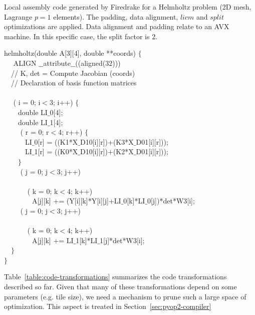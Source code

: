 \documentclass[conference]{IEEEtran}
\begin{document}
\begin{algorithm}[t]
\small
\caption{Local assembly code generated by Firedrake for a Helmholtz problem (2D mesh, Lagrange $p=1$ elements). The padding, data alignment, $licm$ and $split$ optimizations are applied. Data alignment and padding relate to an AVX machine. In this specific case, the split factor is 2.}
\label{code:helmholtz-split}
 helmholtz(double A[3][4], double **coords) $\lbrace$\\
~~ ALIGN $\_\_$attribute$\_\_$((aligned(32))) \\
~~// K, det = Compute Jacobian (coords) \\
~~// Declaration of basis function matrices \\
~~\\
~~ ( i = 0; i$<$3; i++) $\lbrace$ \\
~~~~double LI$\_$0[4];\\
~~~~double LI$\_$1[4];\\
~~~~ ( r = 0; r$<$4; r++) $\lbrace$ \\
~~~~~~LI$\_$0[r] = ((K1*X$\_$D10[i][r])+(K3*X$\_$D01[i][r]));\\
~~~~~~LI$\_$1[r] = ((K0*X$\_$D10[i][r])+(K2*X$\_$D01[i][r]));\\
~~~~$\rbrace$\\
~~~~ ( j = 0; j$<$3; j++) \\
~~~~~~\\
~~~~~~ ( k = 0; k$<$4; k++) \\
~~~~~~~~A[j][k] += (Y[i][k]*Y[i][j]+LI$\_$0[k]*LI$\_$0[j])*det*W3[i];\\
~~~~ ( j = 0; j$<$3; j++) \\
~~~~~~\\
~~~~~~ ( k = 0; k$<$4; k++) \\
~~~~~~~~A[j][k] += LI$\_$1[k]*LI$\_$1[j]*det*W3[i];\\
~~$\rbrace$\\
$\rbrace$
\end{algorithm}






Table~\ref{table:code-transformations} summarizes the code transformations described so far. Given that many of these transformations depend on some parameters (e.g. tile size), we need a mechanism to prune such a large space of optimization. This aspect is treated in Section~\ref{sec:pyop2-compiler}
\end{document}
